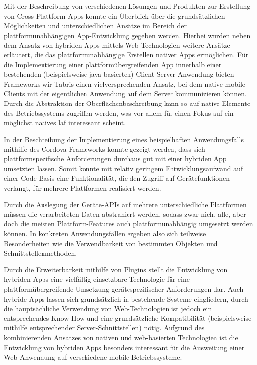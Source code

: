 
	\label{sec:schluss}



Mit der Beschreibung von verschiedenen Lösungen und Produkten zur Erstellung von Cross-Plattform-Apps konnte ein Überblick über die grundsätzlichen Möglichkeiten und unterschiedlichen Ansätze im Bereich der plattformunabhängigen App-Entwicklung gegeben werden.
Hierbei wurden neben dem Ansatz von hybriden Apps mittels Web-Technologien weitere Ansätze erläutert, die das plattformunabhängige Erstellen nativer Apps ermöglichen. 
Für die Implementierung einer plattformübergreifenden App innerhalb einer bestehenden (beispielsweise \gls{java}-basierten) Client-Server-Anwendung bieten Frameworks wir Tabris einen vielversprechenden Ansatz, bei dem native mobile Clients mit der eigentlichen Anwendung auf dem Server kommunizieren können.
Durch die Abstraktion der Oberflächenbeschreibung kann so auf native Elemente des Betriebssystems zugriffen werden, was vor allem für einen Fokus auf ein möglichst natives \gls{laf} interessant scheint.

In der Beschreibung der Implementierung eines beispielhaften Anwendungsfalls mithilfe des Cordova-Frameworks konnte gezeigt werden, dass sich plattformspezifische Anforderungen durchaus gut mit einer hybriden App umsetzten lassen.
Somit konnte mit relativ geringem Entwicklungsaufwand auf einer Code-Basis eine Funktionalität, die den Zugriff auf Gerätefunktionen verlangt, für mehrere Plattformen realisiert werden.

Durch die Auslegung der Geräte-APIs auf mehrere unterschiedliche Plattformen müssen die verarbeiteten Daten abstrahiert werden, sodass zwar nicht alle, aber doch die meisten Plattform-Features auch plattformunabhängig umgesetzt werden können.
In konkreten Anwendungsfällen ergeben also sich teilweise Besonderheiten wie die Verwendbarkeit von bestimmten Objekten und Schnittstellenmethoden.

Durch die Erweiterbarkeit mithilfe von Plugins stellt die Entwicklung von hybriden Apps eine vielfältig einsetzbare Technologie für eine plattformübergreifende  Umsetzung gerätespezifischer Anforderungen dar.
Auch hybride Apps lassen sich grundsätzlich in bestehende Systeme eingliedern, durch die hauptsächliche Verwendung von Web-Technologien ist jedoch ein entsprechendes Know-How und eine grundsätzliche Kompatibilität (beispielsweise mithilfe entsprechender Server-Schnittstellen) nötig.
Aufgrund des kombinierenden Ansatzes von nativen und web-basierten Technologien ist die Entwicklung von hybriden Apps besonders interessant für die Ausweitung einer Web-Anwendung auf verschiedene mobile Betriebssysteme.

